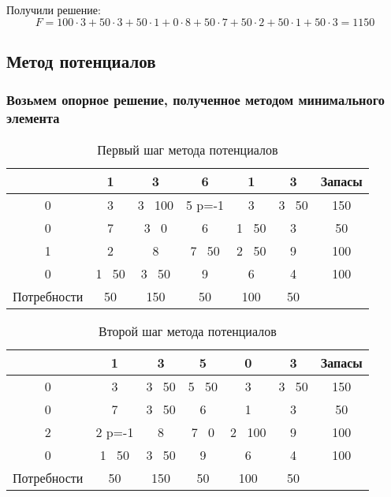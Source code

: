 \documentclass[17pt]{extarticle}
\begin{document}
Получили решение:
\[
    F = 100 \cdot 3 + 50 \cdot 3 + 50 \cdot 1 + 0 \cdot 8 + 50 \cdot 7 + 50 \cdot 2 + 50 \cdot 1 + 50 \cdot 3 = 1150
\]

\subsection*{Метод потенциалов}

\subsubsection*{Возьмем опорное решение, полученное методом минимального элемента}

\begin{table}[h!]
    \centering
    \begin{tabular}{c|ccccc|c}
        \toprule
                    & 1      & 3       & 6      & 1      & 3      & Запасы \\
        \midrule
        0           & 3      & 3 \ 100 & 5 p=-1 & 3      & 3 \ 50 & 150    \\
        0           & 7      & 3 \ 0   & 6      & 1 \ 50 & 3      & 50     \\
        1           & 2      & 8       & 7 \ 50 & 2 \ 50 & 9      & 100    \\
        0           & 1 \ 50 & 3 \ 50  & 9      & 6      & 4      & 100    \\
        \midrule
        Потребности & 50     & 150     & 50     & 100    & 50     &        \\
        \bottomrule
    \end{tabular}
    \caption{Первый шаг метода потенциалов}
\end{table}

\begin{table}[h!]
    \centering
    \begin{tabular}{c|ccccc|c}
        \toprule
                    & 1      & 3      & 5      & 0       & 3      & Запасы \\
        \midrule
        0           & 3      & 3 \ 50 & 5 \ 50 & 3       & 3 \ 50 & 150    \\
        0           & 7      & 3 \ 50 & 6      & 1       & 3      & 50     \\
        2           & 2 p=-1 & 8      & 7 \ 0  & 2 \ 100 & 9      & 100    \\
        0           & 1 \ 50 & 3 \ 50 & 9      & 6       & 4      & 100    \\
        \midrule
        Потребности & 50     & 150    & 50     & 100     & 50     &        \\
        \bottomrule
    \end{tabular}
    \caption{Второй шаг метода потенциалов}
\end{table}
\end{document}
